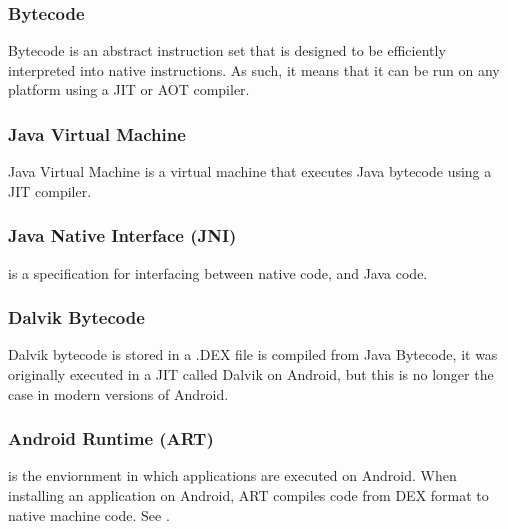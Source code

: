         \subsubsection{Bytecode} Bytecode is an abstract instruction set that is designed to be efficiently interpreted into native instructions. As such, it means that it can be run on any platform using a JIT or AOT compiler.
        \subsubsection{Java Virtual Machine} Java Virtual Machine is a virtual machine that executes Java bytecode using a JIT compiler.
        \subsubsection{Java Native Interface (JNI)} is a specification for interfacing between native code, and Java code.
        \subsubsection{Dalvik Bytecode} Dalvik bytecode is stored in a .DEX file is compiled from Java Bytecode, it was originally executed in a JIT called Dalvik on Android, but this is no longer the case in modern versions of Android. 
        \subsubsection{Android Runtime (ART)} is the enviornment in which applications are executed on Android. When installing an application on Android, ART compiles code from DEX format to native machine code. See \cite{androidart}.

